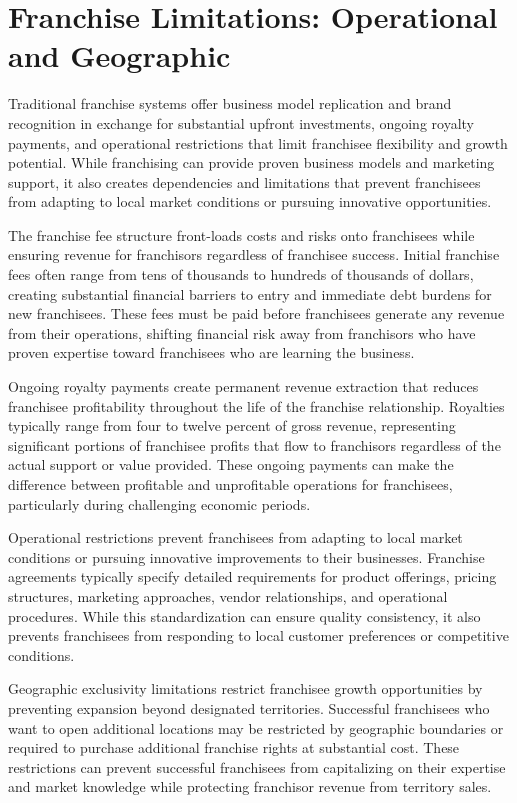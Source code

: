 \documentclass[
  Letterpaper,
]{scrbook}
\begin{document}
\section{Franchise Limitations: Operational and
Geographic}\label{franchise-limitations-operational-and-geographic}

Traditional franchise systems offer business model replication and brand
recognition in exchange for substantial upfront investments, ongoing
royalty payments, and operational restrictions that limit franchisee
flexibility and growth potential. While franchising can provide proven
business models and marketing support, it also creates dependencies and
limitations that prevent franchisees from adapting to local market
conditions or pursuing innovative opportunities.

The franchise fee structure front-loads costs and risks onto franchisees
while ensuring revenue for franchisors regardless of franchisee success.
Initial franchise fees often range from tens of thousands to hundreds of
thousands of dollars, creating substantial financial barriers to entry
and immediate debt burdens for new franchisees. These fees must be paid
before franchisees generate any revenue from their operations, shifting
financial risk away from franchisors who have proven expertise toward
franchisees who are learning the business.

Ongoing royalty payments create permanent revenue extraction that
reduces franchisee profitability throughout the life of the franchise
relationship. Royalties typically range from four to twelve percent of
gross revenue, representing significant portions of franchisee profits
that flow to franchisors regardless of the actual support or value
provided. These ongoing payments can make the difference between
profitable and unprofitable operations for franchisees, particularly
during challenging economic periods.

Operational restrictions prevent franchisees from adapting to local
market conditions or pursuing innovative improvements to their
businesses. Franchise agreements typically specify detailed requirements
for product offerings, pricing structures, marketing approaches, vendor
relationships, and operational procedures. While this standardization
can ensure quality consistency, it also prevents franchisees from
responding to local customer preferences or competitive conditions.

Geographic exclusivity limitations restrict franchisee growth
opportunities by preventing expansion beyond designated territories.
Successful franchisees who want to open additional locations may be
restricted by geographic boundaries or required to purchase additional
franchise rights at substantial cost. These restrictions can prevent
successful franchisees from capitalizing on their expertise and market
knowledge while protecting franchisor revenue from territory sales.
\end{document}
